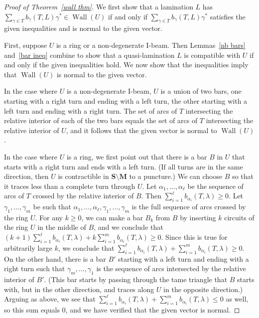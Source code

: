 \documentclass{amsart}
\theoremstyle{definition}
\theoremstyle{remark}
\numberwithin{equation}{section}
\newcommand{\0}{{\mathbf{0}}}
\newcommand{\M}{\mathbf{M}}
\renewcommand{\S}{\mathbf{S}}
\newcommand{\Wall}{\operatorname{Wall}}
\begin{document}
\begin{proof}[Proof of Theorem~\ref{wall thm}]
We first show that a lamination $L$ has $\sum_{\gamma\in T}b_\gamma(T,L)\gamma^*\in\Wall(U)$ if and only if $\sum_{\gamma\in T}b_\gamma(T,L)\gamma^*$ satisfies the given inequalities and is normal to the given vector.

First, suppose $U$ is a ring or a non-degenerate I-beam.
Then Lemmas~\ref{nb bars} and~\ref{bar ineq} combine to show that a quasi-lamination $L$ is compatible with $U$ if and only if the given inequalities hold.
We now show that the inequalities imply that $\Wall(U)$ is normal to the given vector.

In the case where $U$ is a non-degenerate I-beam, $U$ is a union of two bars, one starting with a right turn and ending with a left turn, the other starting with a left turn and ending with a right turn.
The set of arcs of $T$ intersecting the relative interior of each of the two bars equals the set of arcs of $T$ intersecting the relative interior of $U$, and it follows that the given vector is normal to $\Wall(U)$.

In the case where $U$ is a ring, we first point out that there is a bar $B$ in $U$ that starts with a right turn and ends with a left turn.
(If all turns are in the same direction, then $U$ is contractible in $\S\setminus\M$ to a puncture.)
We can choose $B$ so that it traces less than a complete turn through $U$.
Let $\alpha_1,\ldots,\alpha_\ell$ be the sequence of arcs of $T$ crossed by the relative interior of $B$.
Then $\sum_{i=1}^\ell b_{\alpha_i}(T,\lambda)\geq 0$.
Let $\gamma_1,\ldots,\gamma_m$ be such that $\alpha_1,\ldots,\alpha_\ell,\gamma_1,\ldots,\gamma_m$ is the full sequence of arcs crossed by the ring $U$.
For any $k\ge0$, we can make a bar $B_k$ from $B$ by inserting $k$ circuits of the ring $U$ in the middle of $B$, and we conclude that $(k+1)\sum_{i=1}^\ell b_{\alpha_i}(T,\lambda)+{k\sum_{i=1}^m b_{\alpha_i}(T,\lambda)\geq 0}$.
Since this is true for arbitrarily large $k$, we conclude that $\sum_{i=1}^\ell b_{\alpha_i}(T,\lambda)+\sum_{i=1}^m b_{\alpha_i}(T,\lambda)\geq 0$.
On the other hand, there is a bar $B'$ starting with a left turn and ending with a right turn such that $\gamma_m,\ldots,\gamma_1$ is the sequence of arcs intersected by the relative interior of $B'$.
(This bar starts by passing through the tame triangle that $B$ starts with, but in the other direction, and traces along $U$ in the opposite direction.)
Arguing as above, we see that $\sum_{i=1}^\ell b_{\alpha_i}(T,\lambda)+\sum_{i=1}^m b_{\alpha_i}(T,\lambda)\leq 0$ as well, so this sum equals $0$, and we have verified that the given vector is normal.


\end{proof}
\end{document}
